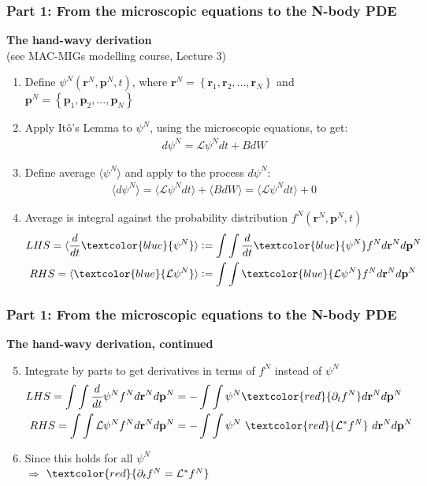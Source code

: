 \documentclass[aspectratio=169,xcolor=dvipsnames]{beamer}
\begin{document}
\begin{frame}
	\frametitle{Part 1: From the microscopic equations to the N-body PDE}
	\textbf{The hand-wavy derivation} \\(see MAC-MIGs modelling course, Lecture 3)
	\vspace{0.2cm}
	\begin{enumerate}
		\item Define $\psi^N(\mathbf{r}^N, \mathbf{p}^N, t)$, where $\mathbf{r}^N = \left\{\mathbf{r}_1, \mathbf{r}_2,..., \mathbf{r}_N\right\}$ and $\mathbf{p}^N = \left\{\mathbf{p}_1, \mathbf{p}_2,..., \mathbf{p}_N\right\}$
		\item Apply It\^{o}'s Lemma to $\psi^N$, using the microscopic equations, to get:
		\begin{align*}
		d\psi^N = {\mathcal{L} \psi^N} dt + B dW
		\end{align*} 
		\item Define average $\langle \psi^N\rangle$ and apply to the process $ d \psi^N$:
		\begin{align*}
		\langle d \psi^N \rangle = \langle  {\mathcal{L} \psi^N} dt\rangle + \langle B dW \rangle = \langle  {\mathcal{L} \psi^N} dt\rangle + 0
		\end{align*}
		\item Average is integral against the probability distribution $f^N(\mathbf{r}^N, \mathbf{p}^N, t)$
		\begin{align*}
		 LHS = \langle \frac{d}{dt} \textcolor{blue}{\psi^N} \rangle &:= \int \int\frac{d}{dt} \textcolor{blue}{\psi^N} f^N d\mathbf{r}^N d\mathbf{p}^N\\
		 RHS = \langle \textcolor{blue}{\mathcal{L} \psi^N}\rangle &:= \int \int\textcolor{blue}{\mathcal{L} \psi^N} f^N d\mathbf{r}^N d\mathbf{p}^N
		\end{align*}
	\end{enumerate}

\end{frame}
\begin{frame}
	\frametitle{Part 1: From the microscopic equations to the N-body PDE}
	\textbf{The hand-wavy derivation, continued}
		\vspace{0.2cm}
	\begin{enumerate}
		\setcounter{enumi}{4}
		\item Integrate by parts to get derivatives in terms of $f^N$ instead of $\psi^N$
		\begin{align*}
		LHS = \int \int\frac{d}{dt} \psi^N f^N d\mathbf{r}^N d\mathbf{p}^N &= -\int \int \psi^N \textcolor{red}{\partial_t f^N} d\mathbf{r}^N d\mathbf{p}^N \\
		RHS = \int \int\mathcal{L} \psi^N f^N d\mathbf{r}^N d\mathbf{p}^N &= - \int \int \psi^N \ \textcolor{red}{\mathcal{L}^* f^N}\ d\mathbf{r}^N d\mathbf{p}^N
		\end{align*}
		\item Since this holds for all $\psi^N$\\
			\vspace{0.2cm}
		$\Rightarrow$  $\textcolor{red}{\partial_t f^N = \mathcal{L}^* f^N}$
	\end{enumerate}
	
\end{frame}
\end{document}
